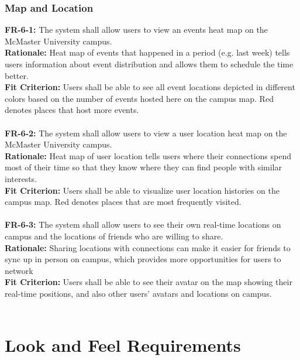 \documentclass[12pt]{article}
\begin{document}
\subsubsection{Map and Location}
    \textbf{FR-6-1:} The system shall allow users to view an events heat map on the McMaster University campus.\\
    \textbf{Rationale:} Heat map of events that happened in a period (e.g. last week) tells users information about event distribution and allows them to schedule the time better.\\
    \textbf{Fit Criterion:} Users shall be able to see all event locations depicted in different colors based on the number of events hosted here on the campus map. Red denotes places that host more events.\\\\
    \textbf{FR-6-2:} The system shall allow users to view a user location heat map on the McMaster University campus.\\
    \textbf{Rationale:} Heat map of user location tells users where their connections spend most of their time so that they know where they can find people with similar interests.\\
    \textbf{Fit Criterion:} Users shall be able to visualize user location histories on the campus map. Red denotes places that are most frequently visited.\\\\
    \textbf{FR-6-3:} The system shall allow users to see their own real-time locations on campus and the locations of friends who are willing to share.\\
    \textbf{Rationale:} Sharing locations with connections can make it easier for friends to sync up in person on campus, which provides more opportunities for users to network\\
    \textbf{Fit Criterion:} Users shall be able to see their avatar on the map showing their real-time positions, and also other users' avatars and locations on campus.\\\\

\section{Look and Feel Requirements}
\end{document}
